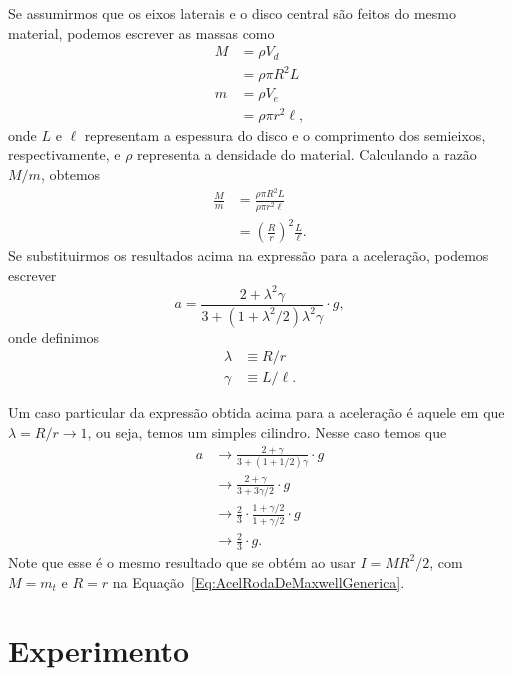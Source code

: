 Se assumirmos que os eixos laterais e o disco central são feitos do mesmo material, podemos escrever as massas como
\begin{align}
    M &= \rho V_d \\
    &= \rho \pi R^2 L \\
    m &= \rho V_e \\
    &= \rho \pi r^2 \ell,
\end{align}
%
onde $L$ e $\ell$ representam a espessura do disco e o comprimento dos semieixos, respectivamente, e $\rho$ representa a densidade do material. Calculando a razão $M/m$, obtemos
\begin{align}
    \frac{M}{m} &= \frac{\rho \pi R^2 L}{\rho \pi r^2 \ell} \\
    &= \left(\frac{R}{r}\right)^2\frac{L}{\ell}.
\end{align}
%
Se substituirmos os resultados acima na expressão para a aceleração, podemos escrever
\begin{equation}
    a = \frac{2 + \lambda^2\gamma}{3 + (1 + \lambda^2/2) \lambda^2 \gamma} \cdot g,
\end{equation}
%
onde definimos
\begin{align}
    \lambda &\equiv R/r \\
    \gamma &\equiv L/\ell.
\end{align}

Um caso particular da expressão obtida acima para a aceleração é aquele em que $\lambda = R/r \to 1$, ou seja, temos um simples cilindro. Nesse caso temos que
\begin{align}
    a &\to \frac{2 + \gamma}{3 + (1 + 1/2)\gamma} \cdot g \\
    &\to \frac{2 + \gamma}{3 + 3\gamma/2} \cdot g \\
    &\to \frac{2}{3} \cdot \frac{ 1 + \gamma/2}{1 + \gamma/2} \cdot g \\
    &\to \frac{2}{3} \cdot g.
\end{align}
%
Note que esse é o mesmo resultado que se obtém ao usar $I = MR^2 / 2$, com $M = m_t$ e $R = r$ na Equação~\eqref{Eq:AcelRodaDeMaxwellGenerica}.

\section{Experimento}

